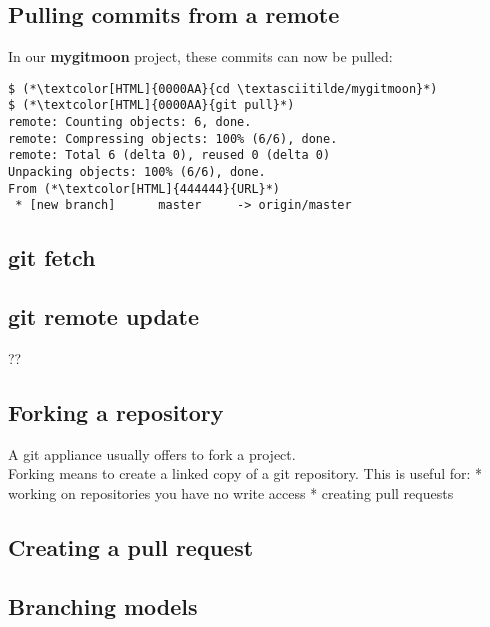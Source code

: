 \subsection{Pulling commits from a remote}
\begin{frame}[fragile]
  \subslidetitle
  In our \textbf{mygitmoon} project, these commits can now be pulled:
  \begin{lstlisting}
$ (*\textcolor[HTML]{0000AA}{cd \textasciitilde/mygitmoon}*)
$ (*\textcolor[HTML]{0000AA}{git pull}*)
remote: Counting objects: 6, done.
remote: Compressing objects: 100% (6/6), done.
remote: Total 6 (delta 0), reused 0 (delta 0)
Unpacking objects: 100% (6/6), done.
From (*\textcolor[HTML]{444444}{URL}*)
 * [new branch]      master     -> origin/master
\end{lstlisting}
\end{frame}

\subsection{git fetch}
\begin{frame}[fragile]
  \subslidetitle
\end{frame}

\subsection{git remote update}
\begin{frame}[fragile]
  \subslidetitle
  ??
\end{frame}

\subsection{Forking a repository}
\begin{frame}[fragile]
  \subslidetitle
  A git appliance usually offers to fork a project.\\
  Forking means to create a linked copy of a git repository.
  \vspace{1em}
  This is useful for:
  * working on repositories you have no write access
  * creating pull requests
\end{frame}

\subsection{Creating a pull request}
\begin{frame}[fragile]
  \subslidetitle
\end{frame}

\subsection{Branching models}
\begin{frame}[fragile]
  \subslidetitle
\end{frame}
